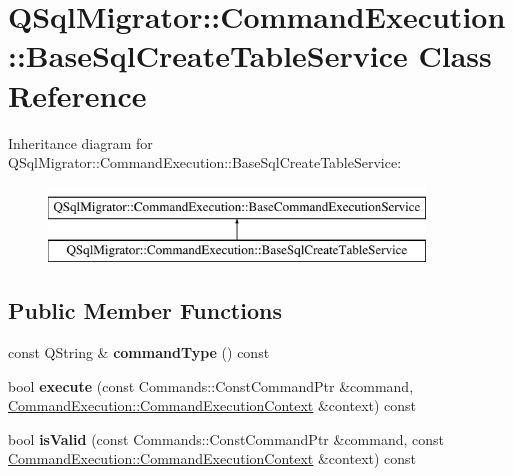 \hypertarget{class_q_sql_migrator_1_1_command_execution_1_1_base_sql_create_table_service}{}\section{Q\+Sql\+Migrator\+:\+:Command\+Execution\+:\+:Base\+Sql\+Create\+Table\+Service Class Reference}
\label{class_q_sql_migrator_1_1_command_execution_1_1_base_sql_create_table_service}
Inheritance diagram for Q\+Sql\+Migrator\+:\+:Command\+Execution\+:\+:Base\+Sql\+Create\+Table\+Service\+:\begin{figure}[H]
\begin{center}
\leavevmode
\includegraphics[height=2.000000cm]{class_q_sql_migrator_1_1_command_execution_1_1_base_sql_create_table_service}
\end{center}
\end{figure}
\subsection*{Public Member Functions}
\begin{DoxyCompactItemize}
\item 
\mbox{\label{class_q_sql_migrator_1_1_command_execution_1_1_base_sql_create_table_service_aca4697ca0b882d66111f61e2263166c1}} 
const Q\+String \& {\bfseries command\+Type} () const
\item 
\mbox{\label{class_q_sql_migrator_1_1_command_execution_1_1_base_sql_create_table_service_a13fb173d3ed435cc8892df934f28f2fb}} 
bool {\bfseries execute} (const Commands\+::\+Const\+Command\+Ptr \&command, \hyperlink{class_q_sql_migrator_1_1_command_execution_1_1_command_execution_context}{Command\+Execution\+::\+Command\+Execution\+Context} \&context) const
\item 
\mbox{\label{class_q_sql_migrator_1_1_command_execution_1_1_base_sql_create_table_service_a7abce9c96889171feacb121d960df25e}} 
bool {\bfseries is\+Valid} (const Commands\+::\+Const\+Command\+Ptr \&command, const \hyperlink{class_q_sql_migrator_1_1_command_execution_1_1_command_execution_context}{Command\+Execution\+::\+Command\+Execution\+Context} \&context) const
\end{DoxyCompactItemize}
